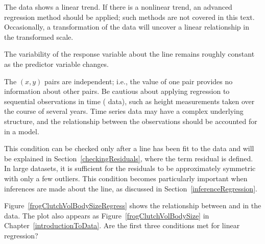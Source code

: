 \begin{description}
\setlength{\itemsep}{0mm}
\item[1 Linearity.] The data shows a linear trend. If there is a nonlinear trend, an advanced regression method should be applied; such methods are not covered in this text.  Occasionally, a transformation of the data will uncover a linear relationship in the transformed scale.
\item[2 Constant variability.] The variability of the response variable about the line remains roughly constant as the predictor variable changes.
\item[3 Independent observations.]  The $(x,y)$ pairs are independent; i.e., the value of one pair provides no information about other pairs. Be cautious about applying regression to sequential observations in time ( data), such as height measurements taken over the course of several years. Time series data may have a complex underlying structure, and the relationship between the observations should be accounted for in a model. 
\item[4 Residuals that are approximately normally distributed.] This condition can be checked only after a line has been fit to the data and will be explained in Section~\ref{checkingResiduals}, where the term residual is defined. In large datasets, it is sufficient for the residuals to be approximately symmetric with only a few outliers. This condition becomes particularly important when inferences are made about the line, as discussed in Section~\ref{inferenceRegression}.  
\end{description}

\begin{exercisewrap}
\begin{nexercise}\label{nonConstantVariance}%
Figure~\ref{frogClutchVolBodySizeRegress} shows the relationship between  and  in the  data.  The plot also appears as Figure~\ref{frogClutchVolBodySize} in Chapter~\ref{introductionToData}. Are the first three conditions met for linear regression?\footnotemark{}
\end{nexercise}
\end{exercisewrap}

